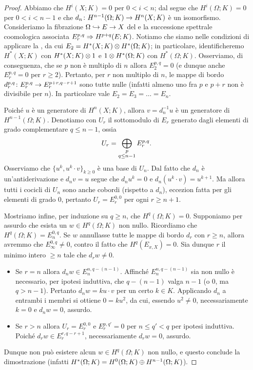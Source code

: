 \begin{proof}
Abbiamo che $H^i(X;K)=0$ per $0<i<n$; dal  segue che $H^i(\Omega;K)=0$ per $0<i<n-1$ e che $d_n\colon H^{n-1}(\Omega;K)\to H^n(X;K)$ è un isomorfismo. Consideriamo la fibrazione $\Omega\hookrightarrow E\to X$ del  e la successione spettrale coomologica associata $E^{p,q}_r\Rightarrow H^{p+q}(E;K)$. Notiamo che siamo nelle condizioni di applicare la , da cui $E_2=H^*(X;K)\mathbin{\otimes} H^*(\Omega;K)$; in particolare, identificheremo $H^*(X;K)$ con $H^*(X;K)\mathbin{\otimes} 1$ e $1\mathbin{\otimes} H^*(\Omega;K)$ con $H^*(\Omega;K)$. Osserviamo, di conseguenza, che se $p$ non è multiplo di $n$ allora $E^{p,q}_2=0$ (e dunque anche $E^{p,q}_r=0$ per $r\ge2$). Pertanto, per $r$ non multiplo di $n$, le mappe di bordo $d^{p,q}_r\colon E^{p,q}_r\to E^{p+r,q-r+1}_r$ sono tutte nulle (infatti almeno uno fra $p$ e $p+r$ non è divisibile per $n$). In particolare vale $E_2=E_3=\ldots=E_n$.

Poiché $u$ è un generatore di $H^n(X;K)$, allora $v=d_n^{-1}u$ è un generatore di $H^{n-1}(\Omega;K)$. Denotiamo con $U_r$ il sottomodulo di $E_r$ generato dagli elementi di grado complementare $q\le n-1$, ossia
$$
U_r=\bigoplus_{\substack{p\\q\le n-1}}E^{p,q}_r.
$$
Osserviamo che $\{u^k,u^k\cdot v\}_{k\ge 0}$ è una base di $U_n$. Dal fatto che $d_n$ è un'antiderivazione e $d_nv=u$ segue che $d_n u^k=0$ e $d_n(u^k\cdot v)=u^{k+1}$. Ma allora tutti i cocicli di $U_n$ sono anche cobordi (rispetto a $d_n$), eccezion fatta per gli elementi di grado $0$, pertanto $U_r=E^{0,0}_r$ per ogni $r\ge n+1$.

Mostriamo infine, per induzione su $q\ge n$, che $H^q(\Omega;K)=0$. Supponiamo per assurdo che esista un $w\in H^q(\Omega;K)$ non nullo. Ricordiamo che $H^q(\Omega;K)=E^{0,q}_n$. Se $w$ annullasse tutte le mappe di bordo $d_r$ con $r\ge n$, allora avremmo che $E^{0,q}_\infty\neq 0$, contro il fatto che $H^q(E_{x,X})=0$. Sia dunque $r$ il minimo intero $\ge n$ tale che $d_rw\neq 0$.
\begin{itemize}
\item Se $r=n$ allora $d_nw\in E^{n,q-(n-1)}_n$. Affinché $E^{n,q-(n-1)}_n$ sia non nullo è necessario, per ipotesi induttiva, che $q-(n-1)$ valga $n-1$ (o $0$, ma $q>n-1$). Pertanto $d_nw=ku\cdot v$ per un certo $k\in K$. Applicando $d_n$ a entrambi i membri si ottiene $0=ku^2$, da cui, essendo $u^2\neq 0$, necessariamente $k=0$ e $d_nw=0$, assurdo.
\item Se $r>n$ allora $U_r=E^{0,0}_r$ e $E^{p,q'}_r=0$ per $n\le q'<q$ per ipotesi induttiva. Poiché $d_rw\in E^{r,q-r+1}_r$, necessariamente $d_rw=0$, assurdo.
\end{itemize}
Dunque non può esistere alcun $w\in H^q(\Omega;K)$ non nullo, e questo conclude la dimostrazione (infatti $H^*(\Omega;K)=H^0(\Omega;K)\mathbin{\oplus} H^{n-1}(\Omega;K)$).
\end{proof}
